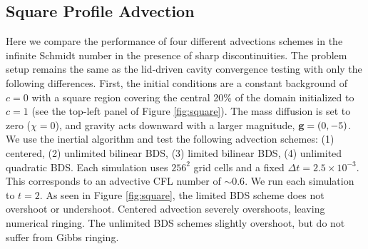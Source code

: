 \documentclass[final]{siamltex}
\def\gb {{\bf g}}
\begin{document}
\subsection{Square Profile Advection}
Here we compare the performance of four different advections schemes in the
infinite Schmidt number in the presence of sharp discontinuities.  The problem setup
remains the same as the lid-driven cavity convergence testing with only the following differences.
First, the initial conditions are a constant background of $c=0$ with a square region covering
the central 20\% of the domain initialized to $c=1$ 
(see the top-left panel of Figure \ref{fig:square}).  The mass diffusion is set to zero ($\chi=0$),
and gravity acts downward with a larger magnitude, $\gb=(0,-5)$.
We use the inertial algorithm and test the following advection schemes: (1) centered,
(2) unlimited bilinear BDS, (3) limited bilinear BDS, (4) unlimited quadratic BDS.
Each simulation uses $256^2$ grid cells and a fixed $\Delta t=2.5\times 10^{-3}$.  
This corresponds to an advective CFL number of $\sim 0.6$.
We run each simulation to $t=2$.  As seen in Figure \ref{fig:square},
the limited BDS scheme does not overshoot or undershoot.  Centered advection
severely overshoots, leaving numerical ringing.  The unlimited BDS
schemes slightly overshoot, but do not suffer from Gibbs ringing.
\end{document}
